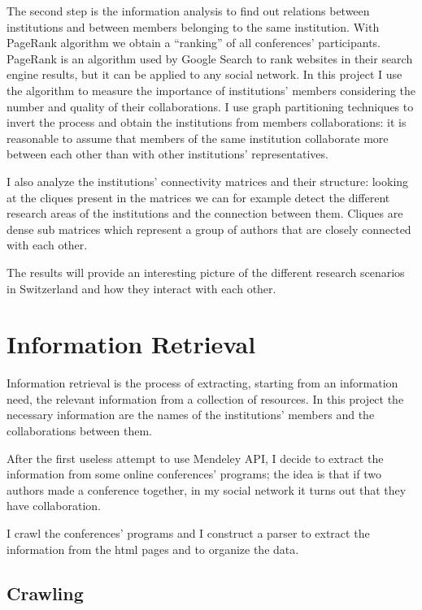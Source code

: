 \documentclass[]{usiinfbachelorproject}
\begin{document}
The second step is the information analysis to find out relations between institutions and between members belonging to the same institution. With PageRank algorithm we obtain a ``ranking'' of all conferences' participants.
PageRank is an algorithm used by Google Search to rank websites in their search engine results, but it can be applied to any social network. In this project I use the algorithm to measure the importance of institutions' members considering the number and quality of their collaborations. I use graph partitioning techniques to invert the process and obtain the institutions from members collaborations: it is reasonable to assume that members of the same institution collaborate more between each other than with other institutions' representatives.

I also analyze the institutions' connectivity matrices and their structure: looking at the cliques present in the matrices we can for example detect the different research areas of the institutions and the connection between them. Cliques are dense sub matrices which represent a group of authors that are closely connected with each other. 

The results will provide an interesting picture of the different research scenarios in Switzerland and how they interact with each other.






\section{Information Retrieval} \label{sec:inforetrieval} 

Information retrieval is the process of extracting, starting from an information need, the relevant information from a collection of resources. In this project the necessary information are the names of the institutions' members and the collaborations between them. 

After the first useless attempt to use Mendeley API, I decide to  extract the information from some online conferences' programs; the idea is that if two authors made a conference together, in my social network it turns out that they have collaboration.

I crawl the conferences' programs and I construct a parser to extract the information from the html pages and  to organize the data.

\subsection{Crawling}
\end{document}
